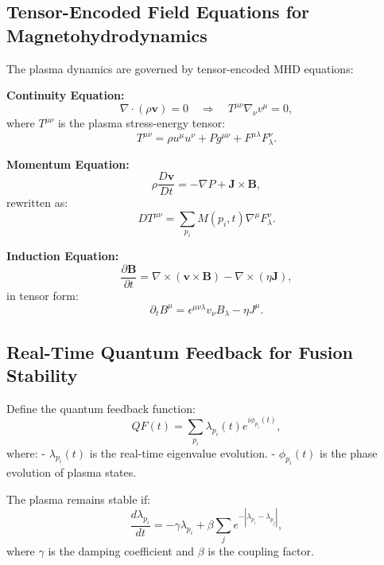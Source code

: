 \documentclass{article}
\theoremstyle{plain}
\begin{document}
\begin{itemize}
\begin{itemize}
\subsection{Tensor-Encoded Field Equations for Magnetohydrodynamics}

The plasma dynamics are governed by tensor-encoded MHD equations:

\textbf{Continuity Equation:}
\begin{equation}
    \nabla \cdot (\rho \mathbf{v}) = 0 \quad \Rightarrow \quad T^{\mu\nu} \nabla_\nu v^\mu = 0,
\end{equation}
where $T^{\mu\nu}$ is the plasma stress-energy tensor:
\begin{equation}
    T^{\mu\nu} = \rho u^\mu u^\nu + P g^{\mu\nu} + F^{\mu\lambda} F_{\lambda}^{\nu}.
\end{equation}

\textbf{Momentum Equation:}
\begin{equation}
    \rho \frac{D \mathbf{v}}{Dt} = -\nabla P + \mathbf{J} \times \mathbf{B},
\end{equation}
rewritten as:
\begin{equation}
    D T^{\mu\nu} = \sum_{p_i} M(p_i, t) \nabla^\mu F_{\lambda}^{\nu}.
\end{equation}

\textbf{Induction Equation:}
\begin{equation}
    \frac{\partial \mathbf{B}}{\partial t} = \nabla \times (\mathbf{v} \times \mathbf{B}) - \nabla \times (\eta \mathbf{J}),
\end{equation}
in tensor form:
\begin{equation}
    \partial_t B^\mu = \epsilon^{\mu\nu\lambda} v_\nu B_\lambda - \eta J^\mu.
\end{equation}

\subsection{Real-Time Quantum Feedback for Fusion Stability}

Define the quantum feedback function:
\begin{equation}
    QF(t) = \sum_{p_i} \lambda_{p_i}(t) e^{i\phi_{p_i}(t)},
\end{equation}
where:
- $\lambda_{p_i}(t)$ is the real-time eigenvalue evolution.
- $\phi_{p_i}(t)$ is the phase evolution of plasma states.

The plasma remains stable if:
\begin{equation}
    \frac{d\lambda_{p_i}}{dt} = -\gamma \lambda_{p_i} + \beta \sum_{j} e^{- |\lambda_{p_i} - \lambda_{p_j}|},
\end{equation}
where $\gamma$ is the damping coefficient and $\beta$ is the coupling factor.


\end{itemize}
\end{itemize}
\end{document}
